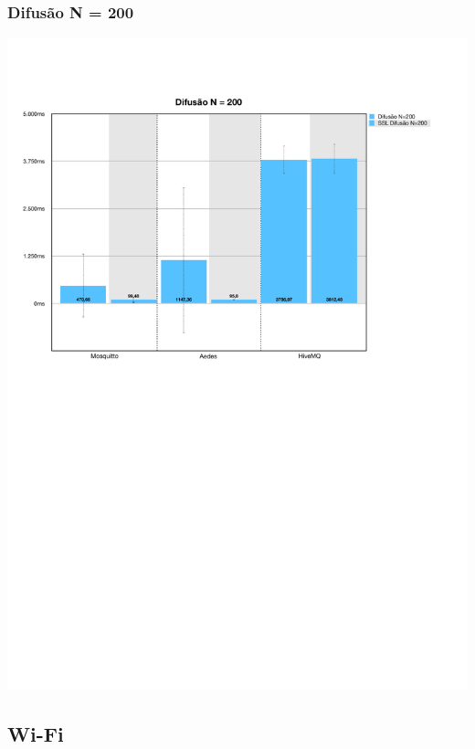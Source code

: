 \documentclass[12pt,a4paper]{article}
\begin{document}
\subsubsection{Difusão N = 200}
\begin{center}
\includegraphics[width=1.0\textwidth]{local_spread2.pdf}
\end{center}
\subsection{Wi-Fi}
\end{document}
